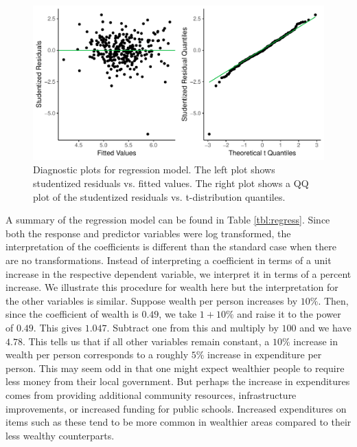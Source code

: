 \documentclass{article}\usepackage[]{graphicx}\usepackage[]{color}
\makeatletter
\def\maxwidth{ %
  \ifdim\Gin@nat@width>\linewidth
    \linewidth
  \else
    \Gin@nat@width
  \fi
}
\newenvironment{knitrout}{}{} %
\makeatother
\begin{document}
\begin{knitrout}
\color{fgcolor}\begin{figure}
\includegraphics[width=\maxwidth]{figure/r_diag_plots-1} \caption{\label{fig:diag} Diagnostic plots for regression model. The left plot shows studentized residuals vs. fitted values. The right plot shows a QQ plot of the studentized residuals vs. t-distribution quantiles.}\label{fig:r diag_plots}
\end{figure}


\end{knitrout}


A summary of the regression model can be found in Table \ref{tbl:regress}. Since both the response and predictor variables were log transformed, the interpretation of the coefficients is different than the standard case when there are no transformations. Instead of interpreting a coefficient in terms of a unit increase in the respective dependent variable, we interpret it in terms of a percent increase. We illustrate this procedure for wealth here but the interpretation for the other variables is similar. Suppose wealth per person increases by $10\%$. Then, since the coefficient of wealth is $0.49$, we take $1 + 10\%$ and raise it to the power of $0.49$. This gives $1.047$. Subtract one from this and multiply by $100$ and we have $4.78$. This tells us that if all other variables remain constant, a $10\%$ increase in wealth per person corresponds to a roughly $5\%$ increase in expenditure per person. This may seem odd in that one might expect wealthier people to require less money from their local government. But perhaps the increase in expenditures comes from providing additional community resources, infrastructure improvements, or increased funding for public schools. Increased expenditures on items such as these tend to be more common in wealthier areas compared to their less wealthy counterparts. 
\end{document}
